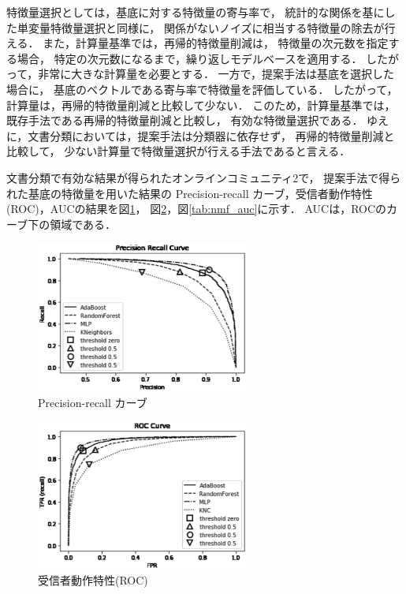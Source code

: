 \documentclass[12pt,a4paper,twocolumn,twoside]{jsik}
\begin{document}
\newpage
特徴量選択としては，基底に対する特徴量の寄与率で，
統計的な関係を基にした単変量特徴量選択と同様に，
関係がないノイズに相当する特徴量の除去が行える．
%
また，計算量基準では，再帰的特徴量削減は，
特徴量の次元数を指定する場合，
特定の次元数になるまで，繰り返しモデルベースを適用する．
したがって，非常に大きな計算量を必要とする．
%
一方で，提案手法は基底を選択した場合に，
基底のベクトルである寄与率で特徴量を評価している．
%
したがって，計算量は，再帰的特徴量削減と比較して少ない．
このため，計算量基準では，既存手法である再帰的特徴量削減と比較し，
有効な特徴量選択である．
%
ゆえに，文書分類においては，提案手法は分類器に依存せず，
再帰的特徴量削減と比較して，
少ない計算量で特徴量選択が行える手法であると言える．

文書分類で有効な結果が得られたオンラインコミュニティ2で，
提案手法で得られた基底の特徴量を用いた結果の
Precision-recall カーブ，受信者動作特性(ROC)，AUCの結果を図\ref{tab:nmf_precision}，
図\ref{tab:nmf_roc}，図\ref{tab:nmf_auc}に示す．
AUCは，ROCのカーブ下の領域である．
%
\begin{figure}[htb]
  \begin{center}
    \includegraphics[width=7cm]{./eps/PrecisionRecall_stackoverflow.eps}
    \caption{Precision-recall カーブ}
    \label{tab:nmf_precision}
  \end{center}
\end{figure}
%
\begin{figure}[htb]
  \begin{center}
    \includegraphics[width=7cm]{./eps/ROC_Curve_stackoverflow.eps}
    \caption{受信者動作特性(ROC)}
    \label{tab:nmf_roc}
  \end{center}
\end{figure}
\end{document}
